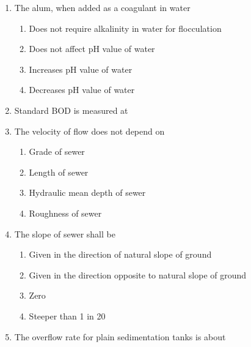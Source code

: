 \documentclass[11pt,a4paper]{article}
\begin{document}
\begin{enumerate}
\\
\item{The alum, when added as a coagulant in water}
\begin{enumerate}[label=\Alph*.]
\item{Does not require alkalinity in water for flocculation}
\item{Does not affect pH value of water}
\item{Increases pH value of water}
\item{Decreases pH value of water}
\end{enumerate}
\item{Standard BOD is measured at}
\\
\item{The velocity of flow does not depend on}
\begin{enumerate}[label=\Alph*.]
\item{Grade of sewer}
\item{Length of sewer}
\item{Hydraulic mean depth of sewer}
\item{Roughness of sewer}
\end{enumerate}
\item{The slope of sewer shall be}
\begin{enumerate}[label=\Alph*.]
\item{Given in the direction of natural slope of ground}
\item{Given in the direction opposite to natural slope of ground}
\item{Zero}
\item{Steeper than 1 in 20}
\end{enumerate}
\item{The overflow rate for plain sedimentation tanks is about}
\begin{enumerate}[label=\Alph*.]

\end{enumerate}
\end{enumerate}
\end{document}
